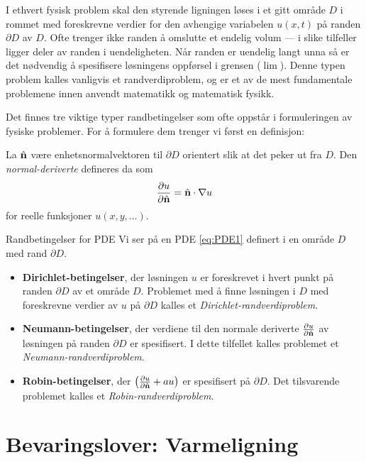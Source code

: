I ethvert fysisk problem skal den styrende ligningen løses i et gitt område \( D \) i rommet med foreskrevne verdier for den avhengige variabelen \( u(x, t) \) på randen \( \partial D \) av \( D \). Ofte trenger ikke randen å omslutte et endelig volum — i slike tilfeller ligger deler av randen i uendeligheten. Når randen er uendelig langt unna så er det nødvendig å spesifisere løsningens oppførsel i grensen ($\lim$). Denne typen problem kalles vanligvis et randverdiproblem, og er et av de mest fundamentale problemene innen anvendt matematikk og matematisk fysikk.


Det finnes tre viktige typer randbetingelser som ofte oppstår i formuleringen av fysiske problemer. For å formulere dem trenger vi først en definisjon:
\begin{defn}{}\label{defn:normalderiv}
La $\hat{\mathbf{n}}$ være enhetsnormalvektoren til $\partial D$ orientert slik at det peker ut fra $D$. Den  \emph{normal-deriverte} defineres da som
\[ \frac{\partial u}{\partial \hat{\mathbf{n}}} = \hat{\mathbf{n} }\cdot \nabla u\]
for reelle funksjoner $u (x,y,\ldots)$.
\end{defn}

\begin{oppsum}{Randbetingelser for PDE}
Vi ser på en PDE \eqref{eq:PDE1} definert i en område $D$ med rand $\partial D$. 
    \begin{itemize}
  \item[1.]\textbf{Dirichlet-betingelser}, der løsningen \( u \) er foreskrevet i hvert punkt på randen \( \partial D \) av et område \( D \). Problemet med å finne løsningen i \( D \) med foreskrevne verdier av \( u \) på \( \partial D \) kalles et \emph{Dirichlet-randverdiproblem}.
  \item[2.]\textbf{Neumann-betingelser}, der verdiene til den normale deriverte \( \frac{\partial u}{\partial \hat{\mathbf{n}}} \) av løsningen på randen \( \partial D \) er spesifisert. I dette tilfellet kalles problemet et \emph{Neumann-randverdiproblem}.
  \item[3.]\textbf{Robin-betingelser}, der \( \left( \frac{\partial u}{\partial \hat{\mathbf{n}}} + a u \right) \) er spesifisert på \( \partial D \). Det tilsvarende problemet kalles et \emph{Robin-randverdiproblem}.
\end{itemize}
\end{oppsum}


\section{Bevaringslover: Varmeligning}\label{sect:bevaringslover}

